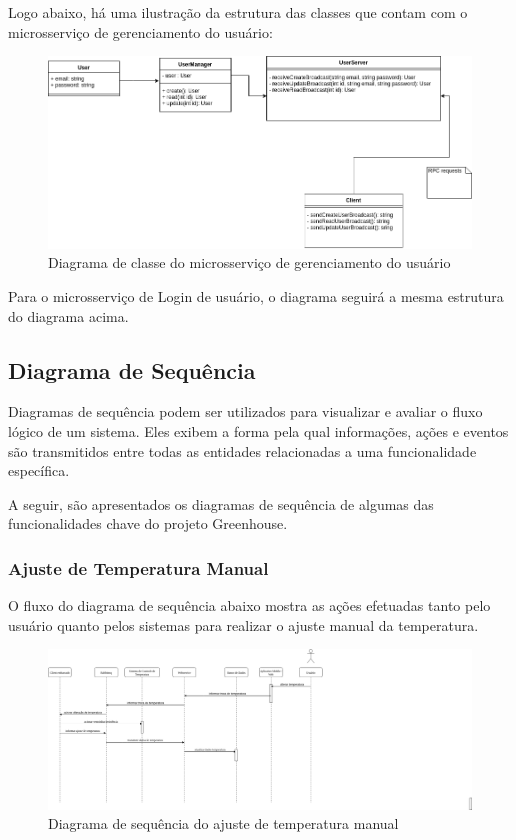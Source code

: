 Logo abaixo, há uma ilustração da estrutura das classes que contam com o microsserviço de gerenciamento do usuário:

\begin{figure}[H]
	\centering
	\includegraphics[width=17cm]{figuras/microservico_usuario.png}
	\caption{Diagrama de classe do microsserviço de gerenciamento do usuário} \label{microservico_usuario}
\end{figure}

Para o microsserviço de Login de usuário, o diagrama seguirá a mesma estrutura do diagrama acima.

\subsection{Diagrama de Sequência}

Diagramas de sequência podem ser utilizados para visualizar e avaliar o fluxo lógico de um sistema. Eles exibem a forma pela qual informações, ações e eventos são transmitidos entre todas as entidades relacionadas a uma funcionalidade específica.

A seguir, são apresentados os diagramas de sequência de algumas das funcionalidades chave do projeto Greenhouse.

\subsubsection{Ajuste de Temperatura Manual}

O fluxo do diagrama de sequência abaixo mostra as ações efetuadas tanto pelo usuário quanto pelos sistemas para realizar o ajuste manual da temperatura.

\begin{figure}[H]
	\centering
	\includegraphics[width=28cm]{figuras/ajuste_manual.png}
	\caption{Diagrama de sequência do ajuste de temperatura manual} \label{ajuste_manual}
\end{figure}

